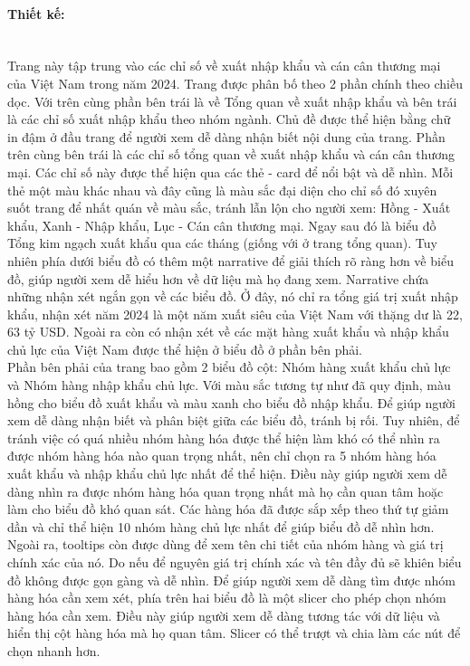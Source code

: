 \documentclass[a4paper]{report}
\begin{document}
{{\paragraph{Thiết kế: } \mbox{}\\
Trang này tập trung vào các chỉ số về xuất nhập khẩu và cán cân thương mại của Việt Nam trong năm 2024. Trang được phân bố theo 2 phần chính theo chiều dọc.
Với trên cùng phần bên trái là về Tổng quan về xuất nhập khẩu và bên trái là các chỉ số xuất nhập khẩu theo nhóm ngành. Chủ đề được thể hiện bằng chữ in đậm ở đầu trang để người xem dễ dàng nhận biết nội dung của trang.
Phần trên cùng bên trái là các chỉ số tổng quan về xuất nhập khẩu và cán cân thương mại. Các chỉ số này được thể hiện qua các thẻ - card để nổi bật và dễ nhìn. Mỗi thẻ một màu khác nhau và đây cũng là màu sắc đại diện cho chỉ số đó xuyên suốt trang để nhất quán về màu sắc, tránh lẫn lộn cho người xem: Hồng - Xuất khẩu, Xanh - Nhập khẩu, Lục - Cán cân thương mại.
Ngay sau đó là biểu đồ Tổng kim ngạch xuất khẩu qua các tháng (giống với ở trang tổng quan). Tuy nhiên phía dưới biểu đồ có thêm một narrative để giải thích rõ ràng hơn về biểu đồ, giúp người xem dễ hiểu hơn về dữ liệu mà họ đang xem.
Narrative chứa những nhận xét ngắn gọn về các biểu đồ. Ở đây, nó chỉ ra tổng giá trị xuất nhập khẩu, nhận xét năm 2024 là một năm xuất siêu của Việt Nam với thặng dư là 22, 63 tỷ USD. Ngoài ra còn có nhận xét về các mặt hàng xuất khẩu và nhập khẩu chủ lực của Việt Nam được thể hiện ở biểu đồ ở phần bên phải.\\

Phần bên phải của trang bao gồm 2 biểu đồ cột: Nhóm hàng xuất khẩu chủ lực và Nhóm hàng nhập khẩu chủ lực. Với màu sắc tương tự như đã quy định, màu hồng cho biểu đồ xuất khẩu và màu xanh cho biểu đồ nhập khẩu. Để giúp người xem dễ dàng nhận biết và phân biệt giữa các biểu đồ, tránh bị rối.
Tuy nhiên, để tránh việc có quá nhiều nhóm hàng hóa được thể hiện làm khó có thể nhìn ra được nhóm hàng hóa nào quan trọng nhất, nên chỉ chọn ra 5 nhóm hàng hóa xuất khẩu và nhập khẩu chủ lực nhất để thể hiện. Điều này giúp người xem dễ dàng nhìn ra được nhóm hàng hóa quan trọng nhất mà họ cần quan tâm hoặc làm cho biểu đồ khó quan sát. Các hàng hóa đã được sắp xếp
theo thứ tự giảm dần và chỉ thể hiện 10 nhóm hàng chủ lực nhất để giúp biểu đồ dễ nhìn hơn. Ngoài ra, tooltips còn được dùng để xem tên chi tiết của nhóm hàng và giá trị chính xác của nó. Do nếu để nguyên giá trị chính xác và tên đầy đủ sẽ khiên biểu đồ không được gọn gàng và dễ nhìn.
Để giúp người xem dễ dàng tìm được nhóm hàng hóa cần xem xét, phía trên hai biểu đồ là một slicer cho phép chọn nhóm hàng hóa cần xem. Điều này giúp người xem dễ dàng tương tác với dữ liệu và hiển thị cột hàng hóa mà họ quan tâm. Slicer có thể trượt và chia làm các nút để chọn nhanh hơn.\\

}}
\end{document}
